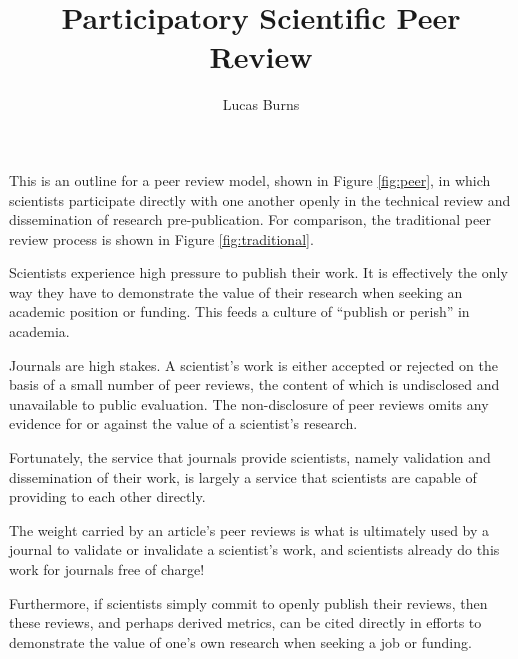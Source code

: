 \documentclass{article}
\begin{document}
\title{Participatory Scientific Peer Review}
\author{Lucas Burns}

\maketitle

This is an outline for a peer review model, shown in Figure \ref{fig:peer}, in which scientists participate directly with one another openly in the technical review and dissemination of research pre-publication. For comparison, the traditional peer review process is shown in Figure \ref{fig:traditional}.

Scientists experience high pressure to publish their work. It is effectively the only way they have to demonstrate the value of their research when seeking an academic position or funding. This feeds a culture of ``publish or perish'' in academia. 

Journals are high stakes. A scientist's work is either accepted or rejected on the basis of a small number of peer reviews, the content of which is undisclosed and unavailable to public evaluation. The non-disclosure of peer reviews omits any evidence for or against the value of a scientist's research.

Fortunately, the service that journals provide scientists, namely validation and dissemination of their work, is largely a service that scientists are capable of providing to each other directly.

The weight carried by an article's peer reviews is what is ultimately used by a journal to validate or invalidate a scientist's work, and scientists already do this work for journals free of charge! 

Furthermore, if scientists simply commit to openly publish their reviews, then these reviews, and perhaps derived metrics, can be cited directly in efforts to demonstrate the value of one's own research when seeking a job or funding.


\end{document}
